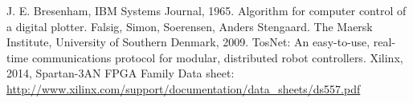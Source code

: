 \begin{thebibliography}{11}

		J. E. Bresenham, IBM Systems Journal, 1965. Algorithm for computer control of a digital plotter.
		Falsig, Simon, Soerensen, Anders Stengaard. The Maersk Institute, University of Southern Denmark, 2009. TosNet: An easy-to-use, real-time communications protocol for modular, distributed robot controllers.
		Xilinx, 2014, Spartan-3AN FPGA Family Data sheet: \url{http://www.xilinx.com/support/documentation/data_sheets/ds557.pdf}	
\end{thebibliography}